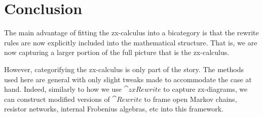 %
%

\section{Conclusion}
\label{sec:Conclusion}

The main advantage of 
fitting the zx-calculus 
into a bicategory is that 
the rewrite rules are now 
explicitly included
into the mathematical structure.
That is, we are now capturing
a larger portion
of the full picture that is
the zx-calculus. 

However, categorifying the
zx-calculus is only
part of the story.
The methods used here
are general
with only slight tweaks
made to accommodate the
case at hand.  
Indeed, similarly to how
we use $\cat{zxRewrite}$
to capture zx-diagrams,
we can construct modified versions
of $\cat{Rewrite}$ to frame 
open Markov chains, resistor networks,
internal Frobenius algebras, etc
into this framework. 
